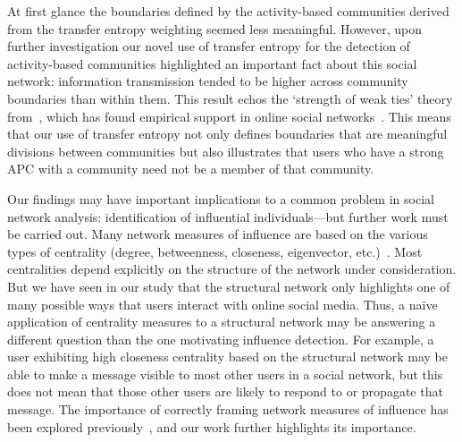 \documentclass[10pt,letterpaper]{article}
\begin{document}


At first glance the boundaries defined by the activity-based communities derived from the transfer entropy weighting seemed less meaningful. However, upon further investigation our novel use of transfer entropy for the detection of activity-based communities highlighted an important fact about this social network: information transmission tended to be higher across community boundaries than within them. This result echos the `strength of weak ties' theory from~\cite{granovetter1973strength}, which has found empirical support in online social networks~\cite{grabowicz2012social}. This means that our use of transfer entropy not only defines boundaries that are meaningful divisions between communities but also illustrates that users who have a strong APC with a community need not be a member of that community. 


Our findings may have important implications to a common problem in social network analysis: identification of influential individuals---but further work must be carried out.
Many network measures of influence are based on the various types of centrality (degree, betweenness, closeness, eigenvector, etc.)~\cite{newman2009networks}. Most centralities depend explicitly on the structure of the network under consideration. But we have seen in our study that the structural network only highlights one of many possible ways that users interact with online social media.
Thus, a na\"ive application of centrality measures to a structural network may be answering a different question than the one motivating influence detection. For example, a user exhibiting high closeness centrality based on the structural network may be able to make a message visible to most other users in a social network, but this does not mean that those other users are likely to respond to or propagate that message. The importance of correctly framing network measures of influence has been explored previously~\cite{kitsak2010identification}, and our work further highlights its importance. 
\end{document}
